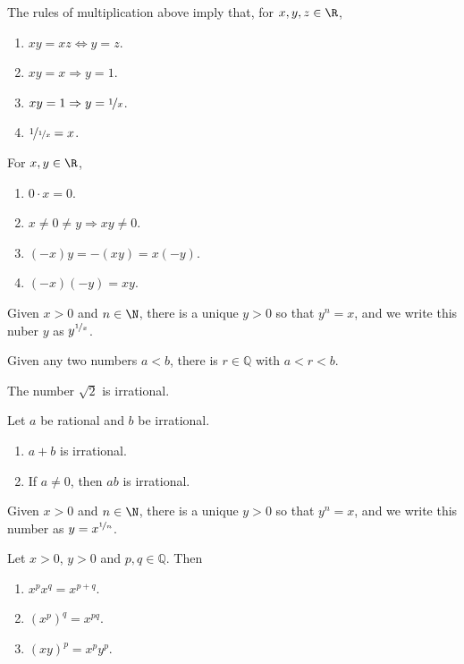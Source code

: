 \documentclass{article}
\begin{document}
\begin{theorem}
    The rules of multiplication above imply that, for $x, y, z \in \R$,
    \begin{enumerate}
        \item $xy=xz\Leftrightarrow y=z$.
        \item $xy=x\Rightarrow y=1$.
        \item $xy=1\Rightarrow y=\nicefrac{1}{x}$.
        \item $\nicefrac{1}{\nicefrac{1}{x}}=x$.
    \end{enumerate}
\end{theorem}
\begin{theorem}
    For $x,y\in\R$,
    \begin{enumerate}
        \item $0\cdot x = 0$.
        \item $x\not=0\not=y\Rightarrow xy\not=0$.
        \item $(-x)y=-(xy)=x(-y)$.
        \item $(-x)(-y)=xy$.
    \end{enumerate}
\end{theorem}
\begin{theorem}
    Given $x>0$ and $n\in\N$, there is a unique $y>0$ so that $y^n=x$, and we write this nuber $y$ as $y^{\nicefrac{1}{x}}$.
\end{theorem}
\begin{theorem}
    Given any two numbers $a<b$, there is $r\in\mathbb{Q}$ with $a<r<b$.
\end{theorem}
\begin{theorem}
    The number $\sqrt{2}$ is irrational.
\end{theorem}
\begin{theorem}
    Let $a$ be rational and $b$ be irrational.
    \begin{enumerate}
        \item $a+b$ is irrational.
        \item If $a\not=0$, then $ab$ is irrational.
    \end{enumerate}
\end{theorem}
\begin{theorem}
    Given $x>0$ and $n\in\N$, there is a unique $y>0$ so that $y^n=x$, and we write this number as $y=x^{\nicefrac{1}{n}}$.
\end{theorem}
\begin{theorem}
    Let $x>0$, $y>0$ and $p,q\in\mathbb{Q}$. Then
    \begin{enumerate}
        \item $x^px^q=x^{p+q}$.
        \item $(x^p)^q=x^{pq}$.
        \item $(xy)^p=x^py^p$.
    \end{enumerate}
\end{theorem}
\end{document}
